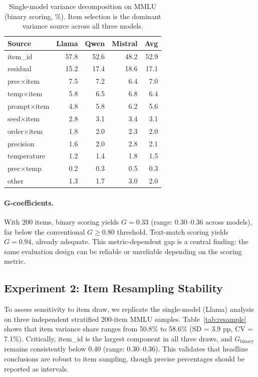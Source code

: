 \documentclass[letterpaper,11pt]{article}
\begin{document}
\begin{table}[t]
\centering
\caption{Single-model variance decomposition on MMLU (binary scoring, \%). Item selection is the dominant variance source across all three models.}
\label{tab:gstudy_mmlu}
\small
\begin{tabular}{@{}l rrrr@{}}
\toprule
Source & Llama & Qwen & Mistral & Avg \\
\midrule
item\_id       & 57.8 & 52.6 & 48.2 & 52.9 \\
residual       & 15.2 & 17.4 & 18.6 & 17.1 \\
prec$\times$item   & 7.5  & 7.2  & 6.4  & 7.0  \\
temp$\times$item   & 5.8  & 6.5  & 6.8  & 6.4  \\
prompt$\times$item & 4.8  & 5.8  & 6.2  & 5.6  \\
seed$\times$item   & 2.8  & 3.1  & 3.4  & 3.1  \\
order$\times$item  & 1.8  & 2.0  & 2.3  & 2.0  \\
precision      & 1.6  & 2.0  & 2.8  & 2.1  \\
temperature    & 1.2  & 1.4  & 1.8  & 1.5  \\
prec$\times$temp   & 0.2  & 0.3  & 0.5  & 0.3  \\
other          & 1.3  & 1.7  & 3.0  & 2.0  \\
\bottomrule
\end{tabular}
\end{table}

\paragraph{G-coefficients.}
With 200 items, binary scoring yields $G = 0.33$ (range: 0.30--0.36 across models), far below the conventional $G \geq 0.80$ threshold.
Text-match scoring yields $G = 0.94$, already adequate.
This metric-dependent gap is a central finding: the same evaluation design can be reliable or unreliable depending on the scoring metric.

\subsection{Experiment 2: Item Resampling Stability}
\label{sec:exp1b}

To assess sensitivity to item draw, we replicate the single-model (Llama) analysis on three independent stratified 200-item MMLU samples.
Table~\ref{tab:resample} shows that item variance share ranges from 50.8\% to 58.6\% (SD = 3.9 pp, CV = 7.1\%).
Critically, item\_id is the largest component in all three draws, and $G_\text{binary}$ remains consistently below 0.40 (range: 0.30--0.36).
This validates that headline conclusions are robust to item sampling, though precise percentages should be reported as intervals.
\end{document}

